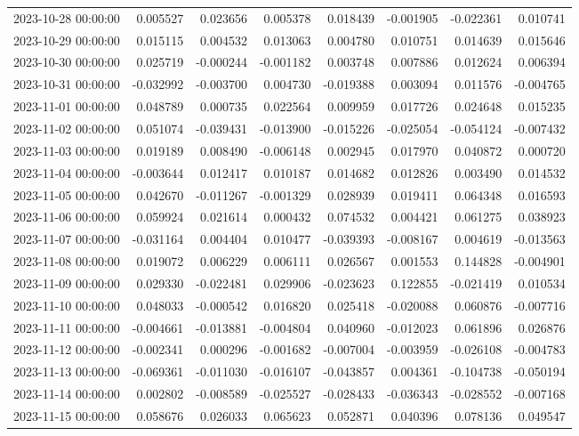 \begin{tabular}{lrrrrrrr}
2023-10-28 00:00:00 & 0.005527 & 0.023656 & 0.005378 & 0.018439 & -0.001905 & -0.022361 & 0.010741 \\
2023-10-29 00:00:00 & 0.015115 & 0.004532 & 0.013063 & 0.004780 & 0.010751 & 0.014639 & 0.015646 \\
2023-10-30 00:00:00 & 0.025719 & -0.000244 & -0.001182 & 0.003748 & 0.007886 & 0.012624 & 0.006394 \\
2023-10-31 00:00:00 & -0.032992 & -0.003700 & 0.004730 & -0.019388 & 0.003094 & 0.011576 & -0.004765 \\
2023-11-01 00:00:00 & 0.048789 & 0.000735 & 0.022564 & 0.009959 & 0.017726 & 0.024648 & 0.015235 \\
2023-11-02 00:00:00 & 0.051074 & -0.039431 & -0.013900 & -0.015226 & -0.025054 & -0.054124 & -0.007432 \\
2023-11-03 00:00:00 & 0.019189 & 0.008490 & -0.006148 & 0.002945 & 0.017970 & 0.040872 & 0.000720 \\
2023-11-04 00:00:00 & -0.003644 & 0.012417 & 0.010187 & 0.014682 & 0.012826 & 0.003490 & 0.014532 \\
2023-11-05 00:00:00 & 0.042670 & -0.011267 & -0.001329 & 0.028939 & 0.019411 & 0.064348 & 0.016593 \\
2023-11-06 00:00:00 & 0.059924 & 0.021614 & 0.000432 & 0.074532 & 0.004421 & 0.061275 & 0.038923 \\
2023-11-07 00:00:00 & -0.031164 & 0.004404 & 0.010477 & -0.039393 & -0.008167 & 0.004619 & -0.013563 \\
2023-11-08 00:00:00 & 0.019072 & 0.006229 & 0.006111 & 0.026567 & 0.001553 & 0.144828 & -0.004901 \\
2023-11-09 00:00:00 & 0.029330 & -0.022481 & 0.029906 & -0.023623 & 0.122855 & -0.021419 & 0.010534 \\
2023-11-10 00:00:00 & 0.048033 & -0.000542 & 0.016820 & 0.025418 & -0.020088 & 0.060876 & -0.007716 \\
2023-11-11 00:00:00 & -0.004661 & -0.013881 & -0.004804 & 0.040960 & -0.012023 & 0.061896 & 0.026876 \\
2023-11-12 00:00:00 & -0.002341 & 0.000296 & -0.001682 & -0.007004 & -0.003959 & -0.026108 & -0.004783 \\
2023-11-13 00:00:00 & -0.069361 & -0.011030 & -0.016107 & -0.043857 & 0.004361 & -0.104738 & -0.050194 \\
2023-11-14 00:00:00 & 0.002802 & -0.008589 & -0.025527 & -0.028433 & -0.036343 & -0.028552 & -0.007168 \\
2023-11-15 00:00:00 & 0.058676 & 0.026033 & 0.065623 & 0.052871 & 0.040396 & 0.078136 & 0.049547 \\

\end{tabular}
